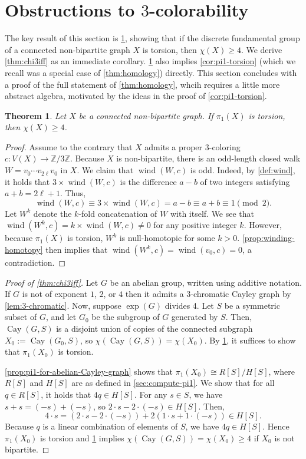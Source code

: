 \documentclass[12pt,letterpaper]{amsart}
\newtheorem{theorem}{Theorem}[section]
\theoremstyle{definition}
\theoremstyle{remark}
\newcommand{\Z}{{\mathbb Z}}
\DeclareMathOperator{\Cay}{Cay}
\DeclareMathOperator{\wind}{wind}
\begin{document}
\section{Obstructions to $3$-colorability}\label{sec:obstructions}

The key result of this section is \cref{thm:torsion-implies-chi4}, showing that if the discrete fundamental group of a connected non-bipartite graph $X$ is torsion, then $\chi(X)\geq 4$. We derive \cref{thm:chi3iff} as an immediate corollary.
\cref{thm:torsion-implies-chi4} also implies \cref{cor:pi1-torsion} (which we recall was a special case of \cref{thm:homology}) directly. This section concludes with a proof of the full statement of \cref{thm:homology}, whcih requires a little more abstract algebra, motivated by the ideas in the proof of \cref{cor:pi1-torsion}.


\begin{theorem}\label{thm:torsion-implies-chi4}
    Let $X$ be a connected non-bipartite graph. If $\pi_1(X)$ is torsion, then $\chi(X)\geq 4$.
\end{theorem}\begin{proof}Assume to the contrary that $X$ admits a proper 3-coloring $c:V(X)\to\Z/3\Z$. 
Because $X$ is non-bipartite, there is an odd-length closed walk $W=v_0\cdots v_{2\ell}v_0$ in $X$. We claim that $\wind(W,c)$ is odd. Indeed, by \cref{def:wind}, it holds that $3\times\wind(W,c)$ is the difference $a-b$ of two integers satisfying $a+b=2\ell+1$. Thus,
$$\wind(W,c)\equiv 3\times\wind(W,c)=a-b\equiv a+b\equiv 1\pmod 2.$$
Let $W^k$ denote the $k$-fold concatenation of $W$ with itself. We see that $\wind(W^k,c)=k\times\wind(W,c)\neq 0$ for any positive integer $k$. However, because $\pi_1(X)$ is torsion, $W^k$ is null-homotopic for some $k>0$.
\cref{prop:winding-homotopy} then implies that $\wind(W^k,c)=\wind(v_0,c)=0$, a contradiction.
\end{proof}

\begin{proof}[Proof of \cref{thm:chi3iff}]
Let $G$ be an abelian group, written using additive notation. If $G$ is not of exponent $1$, $2$, or $4$ then it admits a 3-chromatic Cayley graph by \cref{lem:3-chromatic}.
Now, suppose $\exp(G)$ divides 4. Let $S$ be a symmetric subset of $G$, and let $G_0$ be the subgroup of $G$ generated by $S$. Then, $\Cay(G,S)$ is a disjoint union of copies of the connected subgraph $X_0:=\Cay(G_0,S)$, so $\chi(\Cay(G,S))=\chi(X_0)$. By \cref{thm:torsion-implies-chi4}, it suffices to show that $\pi_1(X_0)$ is torsion.

\cref{prop:pi1-for-abelian-Cayley-graph} shows that $\pi_1(X_0)\cong R[S]/H[S]$, where $R[S]$ and $H[S]$ are as defined in \cref{sec:compute-pi1}. We show that for all $q\in R[S]$, it holds that $4q\in H[S]$. For any $s\in S$, we have $s+s=(-s)+(-s)$, so $2\cdot s-2\cdot (-s)\in H[S]$. Then,
\[4\cdot s=(2\cdot s-2\cdot(-s))+2(1\cdot s+1\cdot(-s))\in H[S].\]
Because $q$ is a linear combination of elements of $S$, we have $4q\in H[S]$.
Hence $\pi_1(X_0)$ is torsion and \cref{thm:torsion-implies-chi4} implies $\chi(\Cay(G,S))=\chi(X_0)\geq 4$ if $X_0$ is not bipartite.
\end{proof}
\end{document}

